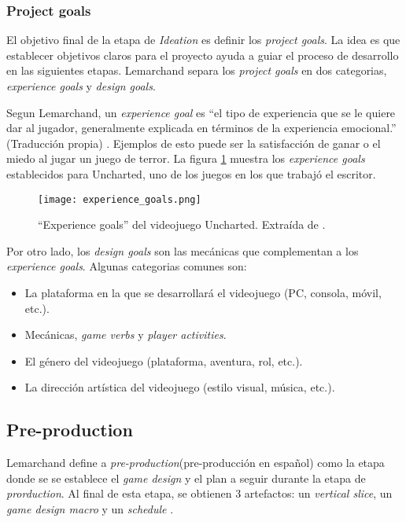 \subsubsection{Project goals}
\par El objetivo final de la etapa de \textit{Ideation} es definir los \textit{project goals}. La idea es que establecer objetivos claros para el proyecto ayuda a guiar el proceso de desarrollo en las siguientes etapas. Lemarchand separa los \textit{project goals} en dos categorias, \textit{experience goals} y \textit{design goals}. 
\bigbreak
\par Segun Lemarchand, un \textit{experience goal} es ``el tipo de experiencia que se le quiere dar al jugador, generalmente explicada en términos de la experiencia emocional.'' (Traducción propia) \cite{lemarchandPlayfulProductionProcess2021}. Ejemplos de esto puede ser la satisfacción de ganar o el miedo al jugar un juego de terror. La figura \ref{fig:x ejemplo de experience goals Lemarchand} muestra los \textit{experience goals} establecidos para Uncharted, uno de los juegos en los que trabajó el escritor.
%
\begin{figure}[H]
    \centering
    \texttt{[image: experience\_goals.png]}
    \caption{``Experience goals'' del videojuego Uncharted. Extraída de \cite{lemarchandPlayfulProductionProcess2021}.}
    \label{fig:x ejemplo de experience goals Lemarchand}
\end{figure} 
%
\par Por otro lado, los \textit{design goals} son las mecánicas que complementan a los \textit{experience goals}. Algunas categorias comunes son:
\begin{itemize}
    \item La plataforma en la que se desarrollará el videojuego (PC, consola, móvil, etc.).
    \item Mecánicas, \textit{game verbs} y \textit{player activities}.
    \item El género del videojuego (plataforma, aventura, rol, etc.).
    \item La dirección artística del videojuego (estilo visual, música, etc.).
\end{itemize}
%
%
%
\subsection{Pre-production}
\par Lemarchand define a \textit{pre-production}(pre-producción en español) como la etapa donde se se establece el \textit{game design} y el plan a seguir durante la etapa de \textit{prorduction}. Al final de esta etapa, se obtienen 3 artefactos: un \textit{vertical slice}, un \textit{game design macro} y un \textit{schedule} \cite{lemarchandPlayfulProductionProcess2021}.
%
%
